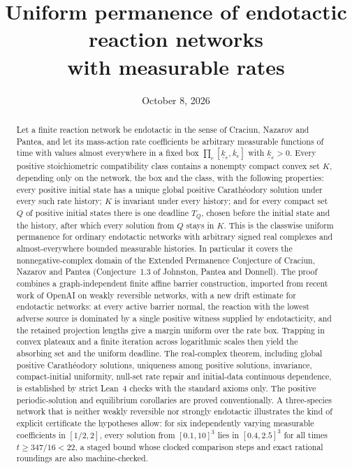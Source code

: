 \documentclass[11pt]{article}
\title{Uniform permanence of endotactic reaction networks\\with measurable rates}
\author{}
\date{October 8, 2026}
\theoremstyle{definition}
\theoremstyle{remark}
\begin{document}
\maketitle

\begin{abstract}
Let a finite reaction network be endotactic in the sense of Craciun, Nazarov and
Pantea, and let its mass-action rate coefficients be arbitrary measurable functions
of time with values almost everywhere in a fixed box $\prod_e[\underline k_e,\overline k_e]$ with
$\underline k_e>0$. Every positive stoichiometric compatibility
class contains a nonempty compact convex set $K$, depending only on the network,
the box and the class, with the following properties: every positive initial state
has a unique global positive Carath\'eodory solution under every such rate history;
$K$ is invariant under every history; and for every compact set $Q$ of positive
initial states there is one deadline $T_Q$, chosen before the initial state and the
history, after which every solution from $Q$ stays in $K$. This is the
classwise uniform permanence for ordinary endotactic networks with arbitrary
signed real complexes and almost-everywhere bounded measurable histories. In
particular it covers the nonnegative-complex domain of the Extended Permanence
Conjecture of Craciun, Nazarov and Pantea
(Conjecture~1.3 of Johnston, Pantea and Donnell). The proof combines a graph-independent finite affine barrier
construction, imported from recent work of OpenAI on weakly reversible networks,
with a new drift estimate for endotactic networks: at every active barrier normal,
the reaction with the lowest adverse source is dominated by a single positive
witness supplied by endotacticity, and the retained projection lengths give a
margin uniform over the rate box. Trapping in convex plateaux and a finite
iteration across logarithmic scales then yield the absorbing set and the uniform
deadline. The real-complex theorem, including global positive Carath\'eodory
solutions, uniqueness among positive solutions, invariance, compact-initial
uniformity, null-set rate repair and initial-data continuous dependence, is
established by strict Lean~4 checks with the standard axioms only. The positive
periodic-solution and equilibrium corollaries are proved conventionally. A three-species network that is neither weakly reversible
nor strongly endotactic illustrates the kind of explicit certificate the
hypotheses allow: for six independently varying measurable coefficients in
$[1/2,2]$, every solution from $[0.1,10]^3$ lies in $[0.4,2.5]^3$ for all times
$t\ge 347/16<22$, a staged bound whose clocked comparison steps and exact
rational roundings are also machine-checked.
\end{abstract}
\end{document}
